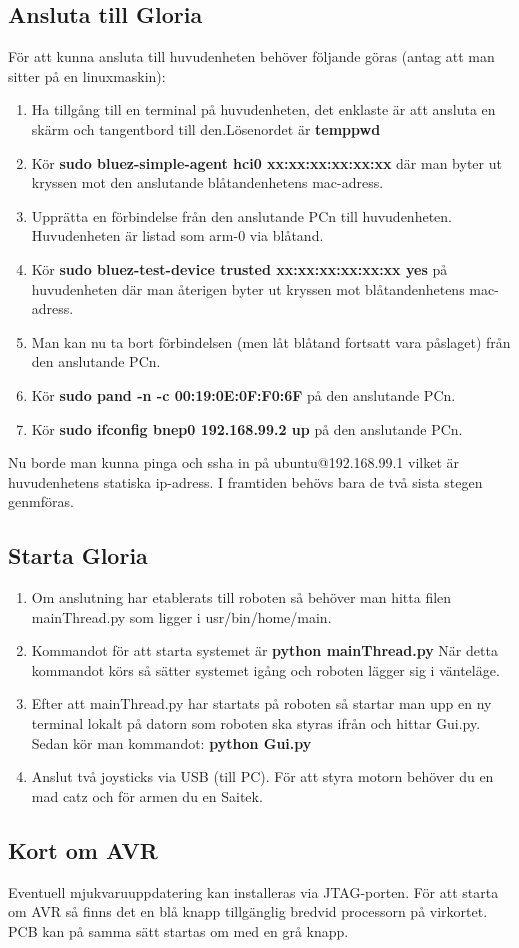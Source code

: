 \subsection{Ansluta till Gloria}
För att kunna ansluta till huvudenheten behöver följande göras (antag att man sitter på en linuxmaskin):
\begin{enumerate}
	\item Ha tillgång till en terminal på huvudenheten, det enklaste är att ansluta en skärm och tangentbord till den.\newline Lösenordet är \textbf{temppwd}
	\item Kör \textbf{sudo bluez-simple-agent hci0 xx:xx:xx:xx:xx:xx} där man byter ut kryssen mot den anslutande blåtandenhetens mac-adress.
	\item Upprätta en förbindelse från den anslutande PCn till huvudenheten. Huvudenheten är listad som arm-0 via blåtand.
	\item Kör \textbf{sudo bluez-test-device trusted xx:xx:xx:xx:xx:xx yes} på huvudenheten där man återigen byter ut kryssen mot blåtandenhetens mac-adress.
	\item Man kan nu ta bort förbindelsen (men låt blåtand fortsatt vara påslaget) från den anslutande PCn.
	\item Kör \textbf{sudo pand -n -c 00:19:0E:0F:F0:6F	} på den anslutande PCn.
	\item Kör \textbf{sudo ifconfig bnep0 192.168.99.2 up } på den anslutande PCn.
\end{enumerate}
Nu borde man kunna pinga och ssha in på ubuntu@192.168.99.1 vilket är huvudenhetens statiska ip-adress. I framtiden behövs bara de två sista stegen genmföras.
\subsection{Starta Gloria}
\begin{enumerate}
	\item Om anslutning har etablerats till roboten så behöver man hitta filen mainThread.py som ligger i usr/bin/home/main.
	\item Kommandot för att starta systemet är \textbf{python mainThread.py}
	När detta kommandot körs så sätter systemet igång och roboten lägger sig i vänteläge.
	\item Efter att mainThread.py har startats på roboten så startar man upp en ny terminal lokalt på datorn som roboten ska styras ifrån och hittar Gui.py. Sedan kör man kommandot: \textbf{python Gui.py}
	\item Anslut två joysticks via USB (till PC). För att styra motorn behöver du en mad catz och för armen du en Saitek.
\end{enumerate}
\subsection{Kort om AVR}
Eventuell mjukvaruuppdatering kan installeras via JTAG-porten.
\newline
För att starta om AVR så finns det en blå knapp tillgänglig bredvid processorn på virkortet. PCB kan på samma sätt startas om med en grå knapp.
\newpage
